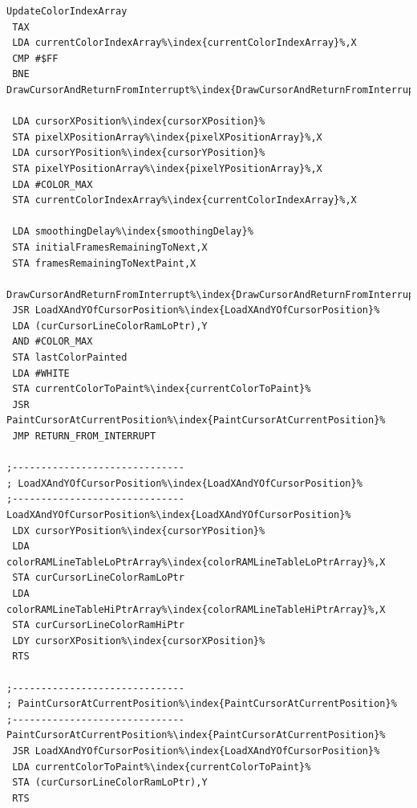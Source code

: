 \begin{minipage}[b]{0.33\linewidth}
\begin{lrbox}{\mybox}%
\begin{lstlisting}[basicstyle=\ttfamily\tiny,escapechar=\%]
UpdateColorIndexArray  
 TAX 
 LDA currentColorIndexArray%\index{currentColorIndexArray}%,X
 CMP #$FF
 BNE DrawCursorAndReturnFromInterrupt%\index{DrawCursorAndReturnFromInterrupt}%

 LDA cursorXPosition%\index{cursorXPosition}%
 STA pixelXPositionArray%\index{pixelXPositionArray}%,X
 LDA cursorYPosition%\index{cursorYPosition}%
 STA pixelYPositionArray%\index{pixelYPositionArray}%,X
 LDA #COLOR_MAX
 STA currentColorIndexArray%\index{currentColorIndexArray}%,X

 LDA smoothingDelay%\index{smoothingDelay}%
 STA initialFramesRemainingToNext,X
 STA framesRemainingToNextPaint,X

DrawCursorAndReturnFromInterrupt%\index{DrawCursorAndReturnFromInterrupt}%   
 JSR LoadXAndYOfCursorPosition%\index{LoadXAndYOfCursorPosition}%
 LDA (curCursorLineColorRamLoPtr),Y
 AND #COLOR_MAX
 STA lastColorPainted
 LDA #WHITE
 STA currentColorToPaint%\index{currentColorToPaint}%
 JSR PaintCursorAtCurrentPosition%\index{PaintCursorAtCurrentPosition}%
 JMP RETURN_FROM_INTERRUPT

;------------------------------
; LoadXAndYOfCursorPosition%\index{LoadXAndYOfCursorPosition}%
;------------------------------
LoadXAndYOfCursorPosition%\index{LoadXAndYOfCursorPosition}%   
 LDX cursorYPosition%\index{cursorYPosition}%
 LDA colorRAMLineTableLoPtrArray%\index{colorRAMLineTableLoPtrArray}%,X
 STA curCursorLineColorRamLoPtr
 LDA colorRAMLineTableHiPtrArray%\index{colorRAMLineTableHiPtrArray}%,X
 STA curCursorLineColorRamHiPtr
 LDY cursorXPosition%\index{cursorXPosition}%
 RTS 

;------------------------------
; PaintCursorAtCurrentPosition%\index{PaintCursorAtCurrentPosition}%
;------------------------------
PaintCursorAtCurrentPosition%\index{PaintCursorAtCurrentPosition}%   
 JSR LoadXAndYOfCursorPosition%\index{LoadXAndYOfCursorPosition}%
 LDA currentColorToPaint%\index{currentColorToPaint}%
 STA (curCursorLineColorRamLoPtr),Y
 RTS 


\end{lstlisting}
\end{lrbox}
\end{minipage}
